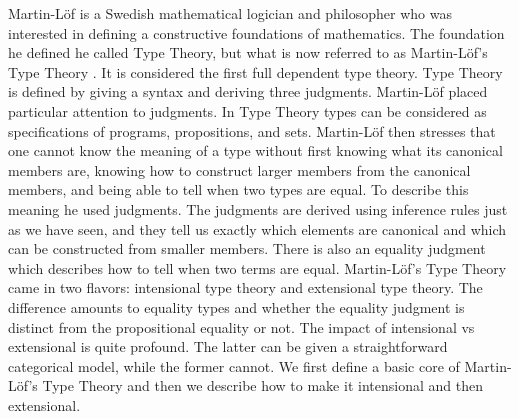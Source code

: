 Martin-L\"of is a Swedish mathematical logician and philosopher who
was interested in defining a constructive foundations of mathematics.
The foundation he defined he called Type Theory, but what is now referred to as Martin-L\"of's Type Theory
\cite{Martin:1982,Martin:1984}.  It is considered the first full
dependent type theory.  Type Theory is defined by giving a syntax and
deriving three judgments.  Martin-L\"of placed particular attention
to judgments.  In Type Theory types can be considered as
specifications of programs, propositions, and sets.  Martin-L\"of then
stresses that one cannot know the meaning of a type without first
knowing what its canonical members are, knowing how to construct
larger members from the canonical members, and being able to tell when
two types are equal.  To describe this meaning he used judgments.  The
judgments are derived using inference rules just as we have seen, and
they tell us exactly which elements are canonical and which can be
constructed from smaller members.  There is also an equality judgment
which describes how to tell when two terms are equal.  Martin-L\"of's
Type Theory came in two flavors: intensional type theory and
extensional type theory.  The difference amounts to equality types and
whether the equality judgment is distinct from the propositional
equality or not.  The impact of intensional vs extensional is quite
profound.  The latter can be given a straightforward categorical
model, while the former cannot.  We first define a basic core of
Martin-L\"of's Type Theory and then we describe how to make it
intensional and then extensional.

